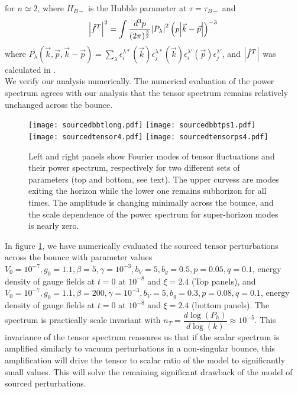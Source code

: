 \documentclass[12pt,a4paper]{article}
\numberwithin{equation}{section}
\numberwithin{equation}{section}
\begin{document}
for $n\simeq2$, where $H_{B-}$ is the Hubble parameter at $\tau=\tau_{B-}$ and 
\begin{equation}
\abs{\hat{f}^T}^2 = \int \frac{d^3p}{(2\pi)^\frac{3}{2}} \abs{ P_{\lambda}}^2 \left(p\abs{\vec{k}-\vec{p}}\right)^{-3}\\
\end{equation}
where $P_{\lambda}\left(\vec{k},\vec{p},\vec{k}-\vec{p}\right)=\sum_{\lambda} \epsilon_i^{\lambda*}(\vec{k}) \epsilon_j^{\lambda*}(\vec{k})
\epsilon_i^{\lambda'}(\vec{p})\epsilon_j^{\lambda'}$, and  $\abs{\hat{f}^T}$ was calculated in \cite{r4}. \\
 We verify our analysis numerically. The numerical evaluation of the power spectrum agrees with our analysis that the tensor spectrum remains relatively unchanged across the bounce. %
\begin{figure}[H]
    \centering
    \texttt{[image: sourcedbbtlong.pdf]} 
    \hspace{0.5cm}
     \texttt{[image: sourcedbbtps1.pdf]} \\
     \texttt{[image: sourcedtensor4.pdf]} 
    \hspace{0.5cm}
     \texttt{[image: sourcedtensorps4.pdf]} 
     \\
     \caption{Left and right panels show Fourier modes of tensor fluctuations and their power spectrum, respectively for two different sets of parameters (top and bottom, see text). The upper curvess are modes exiting the horizon while the lower one remains subhorizon for all times. The amplitude is changing minimally across the bounce, and the scale dependence of the power spectrum for super-horizon modes is nearly zero.} 
\label{fig:sourced tensor spectrum}
\end{figure}
In figure \ref{fig:sourced tensor spectrum}, we have numerically evaluated the sourced tensor perturbations across the bounce with parameter values 
$V_0 = 10^{-7},g_0 = 1.1,\beta = 5,\gamma = 10^{-3},b_V = 5,
b_g = 0.5, p = 0.05 ,q = 0.1$, energy density of gauge fields at $t=0$ at $10^{-8}$ and $\xi = 2.4$ (Top panels), and $V_0 = 10^{-7},g_0 = 1.1,\beta = 200,\gamma = 10^{-3},b_V = 5,
b_g = 0.3, p = 0.08 ,q = 0.1$, energy density of gauge fields at $t=0$ at $10^{-8}$ and $\xi = 2.4$ (bottom panels). 
The spectrum is practically scale invariant with $n_T = \dfrac{d\log(P_h)}{d\log(k)} \approx 10^{-5}$.
This invariance of the tensor spectrum reassures us that if the scalar spectrum is amplified similarly to vacuum perturbations in a non-singular bounce, this amplification will drive the tensor to scalar ratio of the model to significantly small values. This will solve the  remaining significant drawback of the model of sourced perturbations.  
\end{document}
